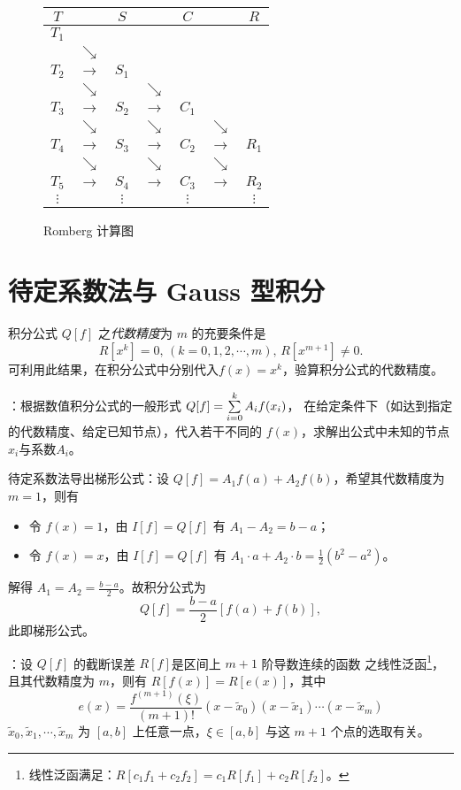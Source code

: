 \begin{figure}[htbp]
\small\renewcommand{\arraystretch}{0.7}\centering
\begin{tabular}{ccccccc}
\toprule
$T$ && $S$ && $C$ && $R$ \\
\midrule
$T_1$ && && && \\
 & $\searrow$ & && && \\
$T_2$ & $\rightarrow$ & $S_1$ && &&\\ 
 & $\searrow$ & & $\searrow$ & && \\
$T_3$ & $\rightarrow$ & $S_2$ & $\rightarrow$ & $C_1$ && \\
& $\searrow$ & & $\searrow$ & & $\searrow$ & \\
$T_4$ & $\rightarrow$ & $S_3$ & $\rightarrow$ & $C_2$ & $\rightarrow$ & $R_1$ \\
& $\searrow$ & & $\searrow$ & & $\searrow$ & \\
$T_5$ & $\rightarrow$ & $S_4$ & $\rightarrow$ & $C_3$ & $\rightarrow$ & $R_2$ \\
$\vdots$ && $\vdots$ && $\vdots$ && $\vdots$ \\
\bottomrule
\end{tabular}
\caption{Romberg 计算图}\label{6-f1}
\end{figure}

\section{待定系数法与 Gauss 型积分}
\trm 积分公式 $Q[f]$ 之\emph{代数精度}为 $m$ 的充要条件是
\[R[x^k]=0,\,(k=0,1,2,\cdots,m),\,R[x^{m+1}]\neq0.\]
可利用此结果，在积分公式中分别代入$f(x)=x^k$，验算积分公式的代数精度。

\entry {}：根据数值积分公式的一般形式 $Q[f]=\sum\limits_{i=0}^kA_if(x_i)$，
在给定条件下（如达到指定的代数精度、给定已知节点），代入若干不同的 $f(x)$，求解出公式中未知的节点$x_i$与系数$A_i$。

\example 待定系数法导出梯形公式：设 $Q[f]=A_1f(a)+A_2f(b)$，希望其代数精度为 $m=1$，则有
\begin{itemize}
    \item 令 $f(x)=1$，由 $I[f]=Q[f]$ 有 $A_1-A_2=b-a$；
    \item 令 $f(x)=x$，由 $I[f]=Q[f]$ 有 $A_1\cdot a + A_2\cdot b=\frac12(b^2-a^2)$。
\end{itemize}
解得 $A_1=A_2=\frac{b-a}2$。故积分公式为
\[Q[f]=\frac{b-a}2[f(a)+f(b)],\]
此即梯形公式。

\entry {}：设 $Q[f]$ 的截断误差 $R[f]$是区间上 $m+1$ 阶导数连续的函数
之线性泛函\footnote{线性泛函满足：$R[c_1f_1+c_2f_2]=c_1R[f_1]+c_2R[f_2]$。}，且其代数精度为 $m$，则有 $R[f(x)]=R[e(x)]$，其中
\begin{equation}\label{6-e2}
e(x)=\frac{f^{(m+1)}(\xi)}{(m+1)!}(x-\tilde{x}_0)(x-\tilde{x}_1)\cdots
(x-\tilde{x}_m)
\end{equation}
$\tilde{x}_0,\tilde{x}_1,\cdots,\tilde{x}_m$ 为 $[a,b]$ 上任意一点，$\xi\in[a,b]$
与这 $m+1$ 个点的选取有关。

